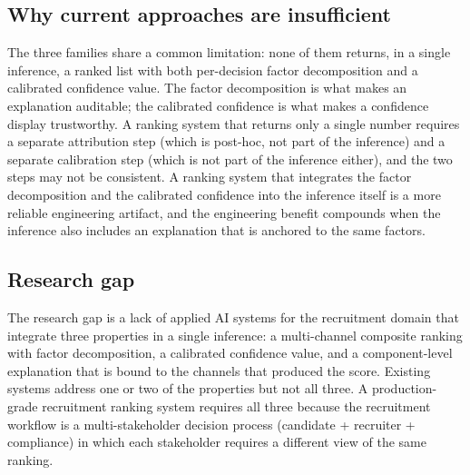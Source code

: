 \subsection{Why current approaches are insufficient}\label{sec:1.4}
The three families share a common limitation: none of them returns, in a single inference, a ranked list with both per-decision factor decomposition and a calibrated confidence value.
The factor decomposition is what makes an explanation auditable; the calibrated confidence is what makes a confidence display trustworthy.
A ranking system that returns only a single number requires a separate attribution step (which is post-hoc, not part of the inference) and a separate calibration step (which is not part of the inference either), and the two steps may not be consistent.
A ranking system that integrates the factor decomposition and the calibrated confidence into the inference itself is a more reliable engineering artifact, and the engineering benefit compounds when the inference also includes an explanation that is anchored to the same factors.

\subsection{Research gap}\label{sec:1.5}
The research gap is a lack of applied AI systems for the recruitment domain that integrate three properties in a single inference: a multi-channel composite ranking with factor decomposition, a calibrated confidence value, and a component-level explanation that is bound to the channels that produced the score.
Existing systems address one or two of the properties but not all three.
A production-grade recruitment ranking system requires all three because the recruitment workflow is a multi-stakeholder decision process (candidate + recruiter + compliance) in which each stakeholder requires a different view of the same ranking.

